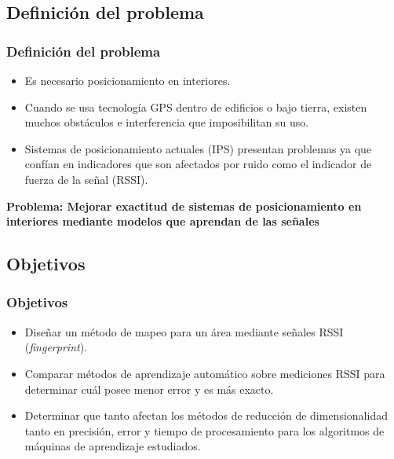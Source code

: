 \documentclass[mathserif]{beamer}
\begin{document}
\subsection{Definición del problema}

\begin{frame}
\frametitle{Definición del problema}

\begin{itemize}

\item Es necesario posicionamiento en interiores.

\pause
\item Cuando se usa tecnología GPS dentro de edificios o bajo tierra, existen muchos obstáculos e interferencia que imposibilitan su uso.

\pause
\item Sistemas de posicionamiento actuales (IPS) presentan problemas ya que confían en indicadores que son afectados por ruido como el indicador de fuerza de la señal (RSSI).

\end{itemize}

\pause
\vspace*{.5cm}
\textbf{Problema: Mejorar exactitud de sistemas de posicionamiento en interiores mediante modelos que aprendan de las señales}

\end{frame}


\subsection{Objetivos} %

\begin{frame}
\frametitle{Objetivos}

\begin{itemize}

\item Diseñar un método de mapeo para un área mediante señales RSSI (\textit{fingerprint}).
\pause
\item Comparar métodos de aprendizaje automático sobre mediciones RSSI para determinar cuál posee menor error y es más exacto.
\pause
\item Determinar que tanto afectan los métodos de reducción de dimensionalidad tanto en precisión, error y tiempo de procesamiento para los algoritmos de máquinas de aprendizaje estudiados.

\end{itemize}

\end{frame}
\end{document}
